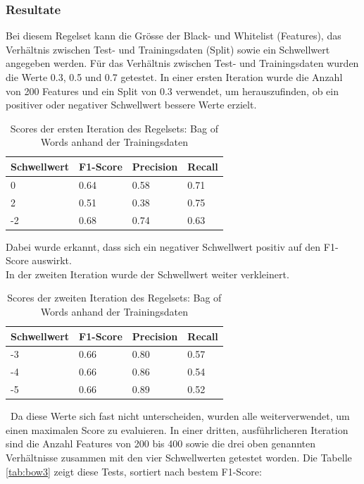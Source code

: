 \subsubsection{Resultate}
Bei diesem Regelset kann die Grösse der Black- und Whitelist (Features), das Verhältnis zwischen Test- und Trainingsdaten (Split) sowie ein Schwellwert angegeben werden.
Für das Verhältnis zwischen Test- und Trainingsdaten wurden die Werte 0.3, 0.5 und 0.7 getestet.
In einer ersten Iteration wurde die Anzahl von 200 Features und ein Split von 0.3 verwendet, um herauszufinden, ob ein positiver oder negativer Schwellwert bessere Werte erzielt.\\
\begin{table}[H]
	\caption{Scores der ersten Iteration des Regelsets: Bag of Words anhand der Trainingsdaten}
	\centering
	\begin{tabular}{|l|l|l|l|}
		\hline
		Schwellwert & F1-Score & Precision & Recall\\
		\hline
		0 & 0.64 & 0.58 & 0.71 \\
		2 & 0.51 & 0.38 & 0.75 \\
		-2 & 0.68 & 0.74 & 0.63 \\
		\hline
	\end{tabular}
\end{table}
Dabei wurde erkannt, dass sich ein negativer Schwellwert positiv auf den F1-Score auswirkt.\\
In der zweiten Iteration wurde der Schwellwert weiter verkleinert.\\
\begin{table}[H]
	\caption{Scores der zweiten Iteration des Regelsets: Bag of Words anhand der Trainingsdaten}
	\centering
	\begin{tabular}{|l|l|l|l|}
		\hline
		Schwellwert & F1-Score & Precision & Recall\\
		\hline
		-3 & 0.66 & 0.80 & 0.57 \\
		-4 & 0.66 & 0.86 & 0.54 \\
		-5 & 0.66 & 0.89 & 0.52 \\
		\hline
	\end{tabular}
\end{table}\
Da diese Werte sich fast nicht unterscheiden, wurden alle weiterverwendet, um einen maximalen Score zu evaluieren.
In einer dritten, ausführlicheren Iteration sind die Anzahl Features von 200 bis 400 sowie die drei oben genannten Verhältnisse zusammen mit den vier Schwellwerten getestet worden. Die Tabelle \cref{tab:bow3} zeigt diese Tests, sortiert nach bestem F1-Score:\\
